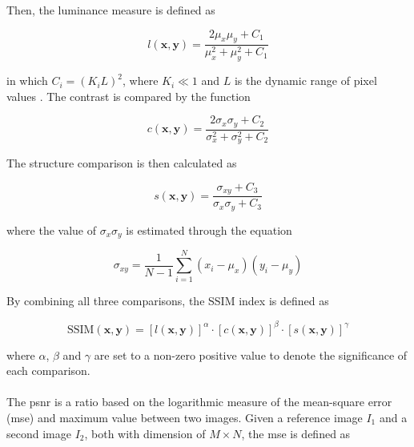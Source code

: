 \documentclass[12pt,oneside]{report}
\begin{document}
Then, the luminance measure is defined as

\begin{equation}
    l(\textbf{x},\textbf{y}) =
    \frac
        {2 \mu_x \mu_y + C_1}
        {\mu_x^2 + \mu_y^2 + C_1}
\end{equation}

in which $C_i = {(K_i L)}^2$, where $K_i \ll 1$ and $L$ is the dynamic range of pixel values \cite{wang_image_2004}. The contrast is compared by the function

\begin{equation}
    c(\textbf{x},\textbf{y}) =
    \frac
        {2 \sigma_x \sigma_y + C_2}
        {\sigma_x^2 + \sigma_y^2 + C_2}
\end{equation}

The structure comparison is then calculated as

\begin{equation}
    s(\textbf{x},\textbf{y}) =
    \frac
        {\sigma_{xy} + C_3}
        {\sigma_x \sigma_y + C_3}
\end{equation}

where the value of $\sigma_x \sigma_y$ is estimated through the equation

\begin{equation}
    \sigma_{xy} =
    \frac{1}{N-1} \sum_{i=1}^N
        (x_i - \mu_x)
        (y_i - \mu_y)
\end{equation}

By combining all three comparisons, the SSIM index is defined as

\begin{equation}
    \text{SSIM}(\textbf{x},\textbf{y}) =
        {[l(\textbf{x},\textbf{y})]}^\alpha \cdot
        {[c(\textbf{x},\textbf{y})]}^\beta \cdot
        {[s(\textbf{x},\textbf{y})]}^\gamma
\end{equation}

where $\alpha$, $\beta$ and $\gamma$ are set to a non-zero positive value to denote the significance of each comparison.

\paragraph{}
The \acrshort{psnr} is a ratio based on the logarithmic measure of the mean-square error (\acrshort{mse}) and maximum value between two images. Given a reference image $I_1$ and a second image $I_2$, both with dimension of $M \times N$, the \acrshort{mse} is defined as
\end{document}
